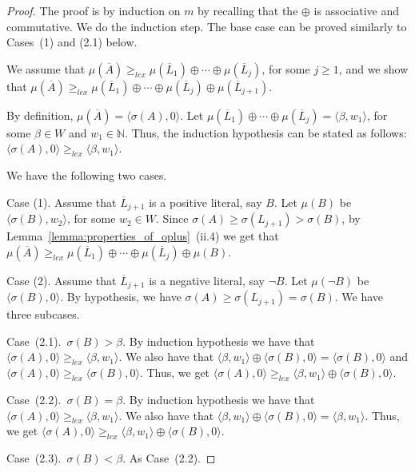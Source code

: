 \documentclass[english]{tlp}
\renewcommand{\mathit}{\displaystyle}
\begin{document}
\begin{proof}
The proof is by induction on $m$ by recalling that the $\oplus$ is 
associative and commutative. We do the induction step. The base case 
can be proved similarly to Cases~(1) and (2.1) below.

We assume that $\mu(\overline{A})\geq_{\mathit
lex}\mu(\overline{L}_1)\oplus\cdots\oplus\mu(\overline{L}_j)$, for some $j\geq 1$, and we show that $\mu(\overline{A})\geq_{\mathit
lex}\mu(\overline{L}_1)\oplus\cdots
\oplus\mu(\overline{L}_{j}) \oplus\mu(\overline{L}_{j+1})$.

By definition, $\mu(\overline{A})=\langle\sigma(A),0\rangle$. Let
$\mu(\overline{L}_1)\oplus\cdots\oplus\mu(\overline{L}_j)=\langle\beta,
w_1\rangle$, for some $\beta \in W$  and 
$w_1\in\mathbb{N}$. Thus, the induction hypothesis can be stated as follows:
$\langle\sigma(A),0\rangle
\geq_{\mathit lex}\langle\beta,w_1\rangle$.


We have the 
following two cases. 

Case (1). Assume that $\overline{L}_{j+1}$ is a positive literal, say $B$. 
Let $\mu(B)$ be $\langle\sigma(B),w_2\rangle$, for some $w_2 \in W$.
Since $\sigma(A)\geq \sigma({L}_{j+1}) > \sigma(B)$,  by
Lemma~\ref{lemma:properties_of_oplus}~(ii.4) we get that
$\mu(\overline{A})\geq_{\mathit lex}\mu(\overline{L}_1)\oplus\cdots\oplus\mu(\overline{L}_{j}) \oplus\mu(B)$. 

Case (2). Assume that $\overline{L}_{j+1}$ is a negative literal, say $\neg B$. Let $\mu(\neg B)$ be $\langle\sigma(B),0\rangle$.
By hypothesis, we have $\sigma(A)\geq\sigma(L_{j+1})=\sigma(B)$. We have three subcases.

\noindent 
Case~(2.1).~$\sigma(B)>\beta$. By induction hypothesis we have that $\langle\sigma(A),0\rangle
\geq_{\mathit lex}\langle\beta,w_1\rangle$. We also have that $\langle\beta,w_1\rangle \oplus\langle\sigma(B),
0\rangle=\langle\sigma(B),0\rangle$  and $\langle\sigma(A),0\rangle
\geq_{\mathit lex}\langle\sigma(B),0\rangle$. Thus, we get 
$\langle\sigma(A),0\rangle
\geq_{\mathit lex} \langle\beta,w_1\rangle \oplus\langle\sigma(B),0\rangle$.

\noindent 
Case~(2.2).~$\sigma(B)=\beta$. By induction hypothesis we 
have that $\langle\sigma(A),0\rangle
\geq_{\mathit lex}\langle\beta,w_1\rangle$.
We also have that 
 $\langle\beta,w_1\rangle\oplus
\langle\sigma(B),0\rangle=\langle\beta, w_1\rangle$.
Thus, we get 
$\langle\sigma(A),0\rangle
\geq_{\mathit lex} \langle\beta,w_1\rangle \oplus\langle\sigma(B),0\rangle$.

\noindent 
Case~(2.3).~$\sigma(B)<\beta$. As Case~(2.2). 
\end{proof} 
\end{document}
